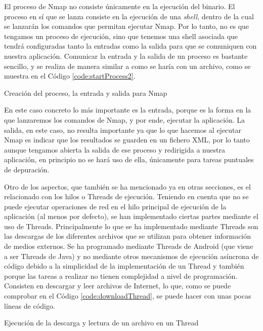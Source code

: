 El proceso de Nmap no consiste únicamente en la ejecución del binario. El proceso en sí que se lanza consiste en la ejecución de una \textit{shell}, dentro de la cual se lanzarán los comandos que permitan ejecutar Nmap. Por lo tanto, no es que tengamos un proceso de ejecución, sino que tenemos una shell asociada que tendrá configuradas tanto la entradas como la salida para que se comuniquen con nuestra aplicación. Comunicar la entrada y la salida de un proceso es bastante sencillo, y se realiza de manera similar a como se haría con un archivo, como se muestra en el Código \ref{code:startProcess2}.

\begin{code}
	\caption{Creación del proceso, la entrada y salida para Nmap}
	\label{code:startProcess2}
	
\end{code}

En este caso concreto lo más importante es la entrada, porque es la forma en la que lanzaremos los comandos de Nmap, y por ende, ejecutar la aplicación. La salida, en este caso, no resulta importante ya que lo que hacemos al ejecutar Nmap es indicar que los resultados se guarden en un fichero XML, por lo tanto aunque tengamos abierta la salida de ese proceso y redirigida a nuestra aplicación, en principio no se hará uso de ella, únicamente para tareas puntuales de depuración.

Otro de los aspectos, que también se ha mencionado ya en otras secciones, es el relacionado con los hilos o Threads de ejecución. Teniendo en cuenta que no se puede ejecutar operaciones de red en el hilo principal de ejecución de la aplicación (al menos por defecto), se han implementado ciertas partes mediante el uso de Threads. Principalmente lo que se ha implementado mediante Threads son las descargas de los diferentes archivos que se utilizan para obtener información de medios externos. Se ha programado mediante Threads de Android (que viene a ser Threads de Java) y no mediante otros mecanismos de ejecución asíncrona de código debido a la simplicidad de la implementación de un Thread y también porque las tareas a realizar no tienen complejidad a nivel de programación. Consisten en descargar y leer archivos de Internet, lo que, como se puede comprobar en el Código \ref{code:downloadThread}, se puede hacer con unas pocas líneas de código.

\begin{code}
	\caption{Ejecución de la descarga y lectura de un archivo en un Thread}
	\label{code:downloadThread}
	
\end{code}

